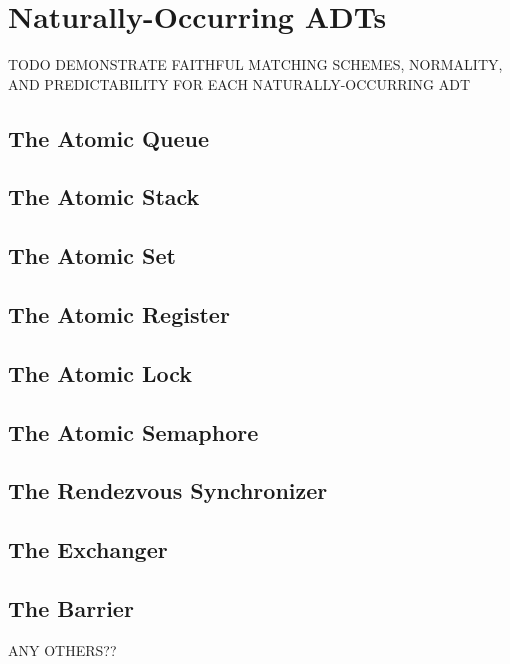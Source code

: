 \section{Naturally-Occurring ADTs}
\label{sec:nature}

TODO DEMONSTRATE FAITHFUL MATCHING SCHEMES, NORMALITY, AND PREDICTABILITY FOR
EACH NATURALLY-OCCURRING ADT

\subsection{The Atomic Queue}

\subsection{The Atomic Stack}

\subsection{The Atomic Set}

\subsection{The Atomic Register}

\subsection{The Atomic Lock}

\subsection{The Atomic Semaphore}

\subsection{The Rendezvous Synchronizer}

\subsection{The Exchanger}

\subsection{The Barrier}

ANY OTHERS??
